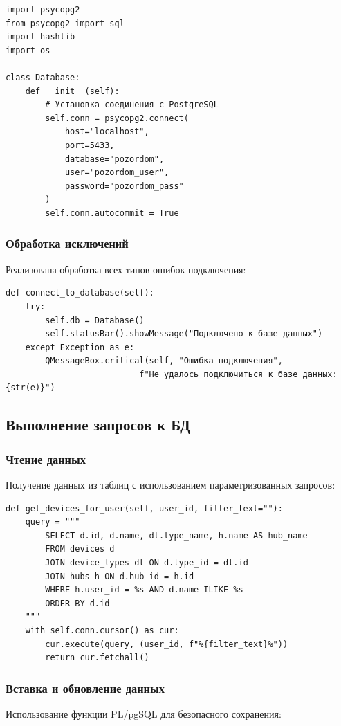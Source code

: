 \documentclass[oneside,a4paper,14pt]{extarticle}
\begin{document}
\begin{verbatim}
import psycopg2
from psycopg2 import sql
import hashlib
import os

class Database:
    def __init__(self):
        # Установка соединения с PostgreSQL
        self.conn = psycopg2.connect(
            host="localhost",
            port=5433,
            database="pozordom",
            user="pozordom_user",
            password="pozordom_pass"
        )
        self.conn.autocommit = True
\end{verbatim}

\subsubsection*{Обработка исключений}
Реализована обработка всех типов ошибок подключения:

\begin{verbatim}
def connect_to_database(self):
    try:
        self.db = Database()
        self.statusBar().showMessage("Подключено к базе данных")
    except Exception as e:
        QMessageBox.critical(self, "Ошибка подключения",
                           f"Не удалось подключиться к базе данных: {str(e)}")
\end{verbatim}

\subsection*{Выполнение запросов к БД}

\subsubsection*{Чтение данных}
Получение данных из таблиц с использованием параметризованных запросов:

\begin{verbatim}
def get_devices_for_user(self, user_id, filter_text=""):
    query = """
        SELECT d.id, d.name, dt.type_name, h.name AS hub_name
        FROM devices d
        JOIN device_types dt ON d.type_id = dt.id
        JOIN hubs h ON d.hub_id = h.id
        WHERE h.user_id = %s AND d.name ILIKE %s
        ORDER BY d.id
    """
    with self.conn.cursor() as cur:
        cur.execute(query, (user_id, f"%{filter_text}%"))
        return cur.fetchall()
\end{verbatim}

\subsubsection*{Вставка и обновление данных}
Использование функции PL/pgSQL для безопасного сохранения:
\end{document}
